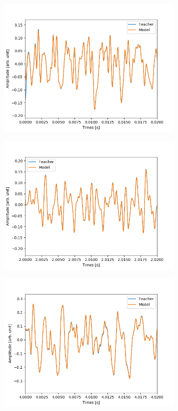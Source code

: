 \documentclass{jreport}		%
\begin{document}
\begin{figure}[htbp]
 \begin{minipage}{0.5\hsize}
 \begin{center}
  \includegraphics[width=90mm]{tone1_output_hikaku.png}
 \end{center}
 \label{fig:one}
 \end{minipage}
 \begin{minipage}{0.5\hsize}
 \begin{center}
  \includegraphics[width=90mm]{tone1_output_hikaku2.png}
 \end{center}
 \label{fig:two}
 \end{minipage}
 \begin{minipage}{0.5\hsize}
 \begin{center}
  \includegraphics[width=90mm]{tone1_output_hikaku3.png}

\end{center}
\end{minipage}
\end{figure}
\end{document}
